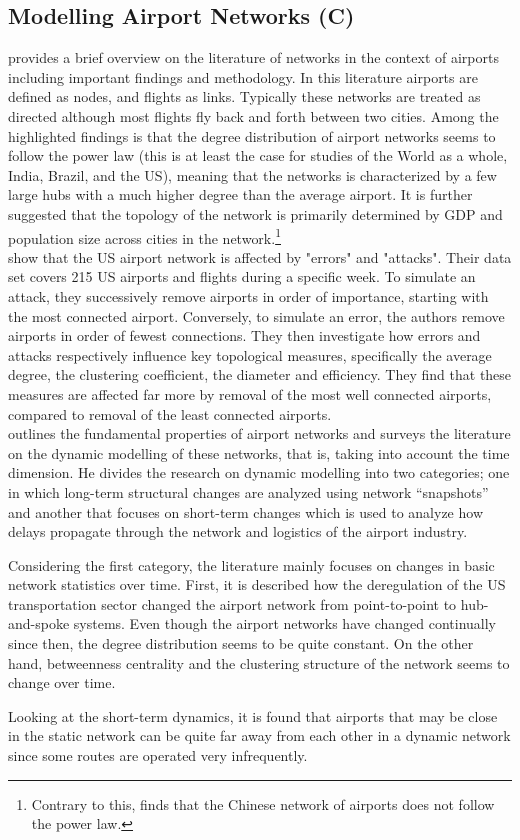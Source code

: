 \subsection{Modelling Airport Networks (C)}
\citet[pp. 41-42]{costa2011analyzing} provides a brief overview on the literature of networks in the context of airports including important findings and methodology. In this literature airports are defined as nodes, and flights as links. Typically these networks are treated as directed although most flights fly back and forth between two cities. Among the highlighted findings is that the degree distribution of airport networks seems to follow the power law (this is at least the case for studies of the World as a whole, India, Brazil, and the US), meaning that the networks is characterized by a few large hubs with a much higher degree than the average airport. It is further suggested that the topology of the network is primarily determined by GDP and population size across cities in the network.\footnote{Contrary to this, \citet{he2004statistics} finds that the Chinese network of airports does not follow the power law.}
\medskip\\
\citet{chi2004structural} show that the US airport network is affected by "errors" and "attacks". Their data set covers 215 US airports and flights during a specific week. To simulate an attack, they successively remove airports in order of importance, starting with the most connected airport. Conversely, to simulate an error, the authors remove airports in order of fewest connections. They then investigate how errors and attacks respectively influence key topological measures, specifically the average degree, the clustering coefficient, the diameter and efficiency. They find that these measures are affected far more by removal of the most well connected airports, compared to removal of the least connected airports.
\medskip\\
\citet{rocha2017dynamics} outlines the fundamental properties of airport networks and surveys the literature on the dynamic modelling of these networks, that is, taking into account the time dimension. He divides the research on dynamic modelling into two categories; one in which long-term structural changes are analyzed using network ``snapshots'' and another that focuses on short-term changes which is used to analyze how delays propagate through the network and logistics of the airport industry.
\par
Considering the first category, the literature mainly focuses on changes in basic network statistics over time. First, it is described how the deregulation of the US transportation sector changed the airport network from point-to-point to hub-and-spoke systems. Even though the airport networks have changed continually since then, the degree distribution seems to be quite constant. On the other hand, betweenness centrality and the clustering structure of the network seems to change over time.
\par
Looking at the short-term dynamics, it is found that airports that may be close in the static network can be quite far away from each other in a dynamic network since some routes are operated very infrequently.